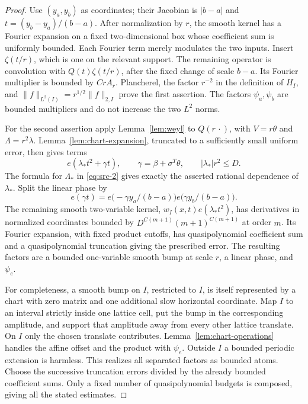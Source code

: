 \begin{proof}
Use \((y_a,y_b)\) as coordinates; their Jacobian is \(|b-a|\) and
\(t=(y_b-y_a)/(b-a)\).
After normalization by \(r\), the smooth kernel has a Fourier
expansion on a fixed two-dimensional box whose coefficient sum is
uniformly bounded.  Each Fourier term merely modulates the two
inputs.  Insert \(\zeta(t/r)\), which is one on the relevant support.
The remaining operator is convolution with
\(Q(t)\zeta(t/r)\), after the fixed change of scale \(b-a\).
Its Fourier multiplier is bounded by \(C r A_r\).
Plancherel, the factor \(r^{-2}\) in the definition of \(H_I\), and
\(\|f\|_{L^2(I)}=r^{1/2}\|f\|_{2,I}\) prove the first assertion.
The factors \(\psi_a,\psi_b\) are bounded multipliers and do not
increase the two \(L^2\) norms.

For the second assertion apply Lemma~\ref{lem:weyl} to \(Q(r\,\cdot)\),
with \(V=r\theta\) and \(\Lambda=r^2\lambda\).
Lemma~\ref{lem:chart-expansion}, truncated to a sufficiently small
uniform error, then gives terms
\[
 e(\lambda_*t^2+\gamma t),\qquad
 \gamma=\beta+\sigma^T\theta,\qquad
 |\lambda_*|r^2\le D .
\]
The formula for \(\Lambda_*\) in \eqref{eq:src-2} gives exactly the
asserted rational dependence of \(\lambda_*\).
Split the linear phase by
\[
 e(\gamma t)=
 e\bigl(-\gamma y_a/(b-a)\bigr)
 e\bigl(\gamma y_b/(b-a)\bigr).
\]
The remaining smooth two-variable kernel,
\(w_I(x,t)e(\lambda_*t^2)\), has derivatives in normalized
coordinates bounded by
\(D^{C(m+1)}(m+1)^{C(m+1)}\) at order \(m\).
Its Fourier expansion, with fixed product cutoffs, has
quasipolynomial coefficient sum and a quasipolynomial truncation
giving the prescribed error.
The resulting factors are a bounded one-variable smooth bump at
scale \(r\), a linear phase, and \(\psi_e\).

For completeness, a smooth bump on \(I\), restricted to \(I\), is
itself represented by a chart with zero matrix and one additional
slow horizontal coordinate.  Map \(I\) to an interval strictly
inside one lattice cell, put the bump in the corresponding amplitude,
and support that amplitude away from every other lattice translate.
On \(I\) only the chosen translate contributes.
Lemma~\ref{lem:chart-operations} handles the affine offset and the
product with \(\psi_e\).  Outside \(I\) a bounded periodic extension
is harmless.  This realizes all separated factors as bounded atoms.
Choose the successive truncation errors divided by the already
bounded coefficient sums.  Only a fixed number of quasipolynomial
budgets is composed, giving all the stated estimates.
\end{proof}

